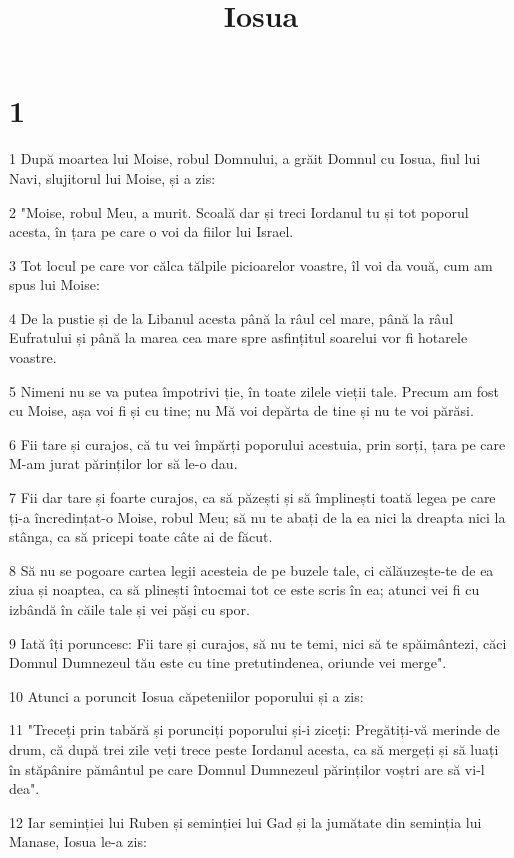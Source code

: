 

\title{Iosua}


\chapter{1}

\par 1 După moartea lui Moise, robul Domnului, a grăit Domnul cu Iosua, fiul lui Navi, slujitorul lui Moise, și a zis:
\par 2 "Moise, robul Meu, a murit. Scoală dar și treci Iordanul tu și tot poporul acesta, în țara pe care o voi da fiilor lui Israel.
\par 3 Tot locul pe care vor călca tălpile picioarelor voastre, îl voi da vouă, cum am spus lui Moise:
\par 4 De la pustie și de la Libanul acesta până la râul cel mare, până la râul Eufratului și până la marea cea mare spre asfințitul soarelui vor fi hotarele voastre.
\par 5 Nimeni nu se va putea împotrivi ție, în toate zilele vieții tale. Precum am fost cu Moise, așa voi fi și cu tine; nu Mă voi depărta de tine și nu te voi părăsi.
\par 6 Fii tare și curajos, că tu vei împărți poporului acestuia, prin sorți, țara pe care M-am jurat părinților lor să le-o dau.
\par 7 Fii dar tare și foarte curajos, ca să păzești și să împlinești toată legea pe care ți-a încredințat-o Moise, robul Meu; să nu te abați de la ea nici la dreapta nici la stânga, ca să pricepi toate câte ai de făcut.
\par 8 Să nu se pogoare cartea legii acesteia de pe buzele tale, ci călăuzește-te de ea ziua și noaptea, ca să plinești întocmai tot ce este scris în ea; atunci vei fi cu izbândă în căile tale și vei păși cu spor.
\par 9 Iată îți poruncesc: Fii tare și curajos, să nu te temi, nici să te spăimântezi, căci Domnul Dumnezeul tău este cu tine pretutindenea, oriunde vei merge".
\par 10 Atunci a poruncit Iosua căpeteniilor poporului și a zis:
\par 11 "Treceți prin tabără și porunciți poporului și-i ziceți: Pregătiți-vă merinde de drum, că după trei zile veți trece peste Iordanul acesta, ca să mergeți și să luați în stăpânire pământul pe care Domnul Dumnezeul părinților voștri are să vi-l dea".
\par 12 Iar seminției lui Ruben și seminției lui Gad și la jumătate din seminția lui Manase, Iosua le-a zis:

